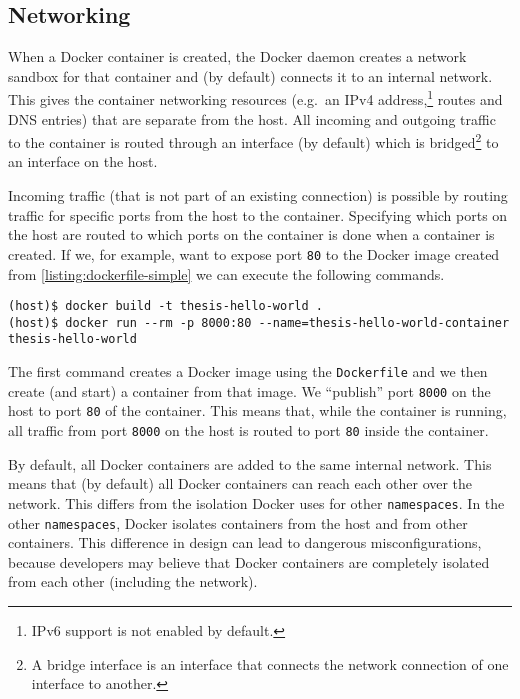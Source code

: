 \subsection{Networking}
When a Docker container is created, the Docker daemon creates a network sandbox for that container and (by default) connects it to an internal network. This gives the container networking resources (e.g.\ an IPv4 address,\footnote{IPv6 support is not enabled by default.} routes and DNS entries) that are separate from the host. All incoming and outgoing traffic to the container is routed through an interface (by default) which is bridged\footnote{A bridge interface is an interface that connects the network connection of one interface to another.} to an interface on the host.

\medskip

Incoming traffic (that is not part of an existing connection) is possible by routing traffic for specific ports from the host to the container.
Specifying which ports on the host are routed to which ports on the container is done when a container is created. If we, for example, want to expose port \lstinline{80} to the Docker image created from \autoref{listing:dockerfile-simple} we can execute the following commands.

\begin{lstlisting}[caption={Creating a Docker container with exposed port.},label={listing:docker-port},captionpos=b]
(host)$ docker build -t thesis-hello-world .
(host)$ docker run --rm -p 8000:80 --name=thesis-hello-world-container thesis-hello-world
\end{lstlisting}

The first command creates a Docker image using the \lstinline{Dockerfile} and we then create (and start) a container from that image. We ``publish'' port \lstinline{8000} on the host to port \lstinline{80} of the container. This means that, while the container is running, all traffic from port \lstinline{8000} on the host is routed to port \lstinline{80} inside the container.

\medskip

By default, all Docker containers are added to the same internal network. This means that (by default) all Docker containers can reach each other over the network. This differs from the isolation Docker uses for other \lstinline{namespaces}. In the other \lstinline{namespaces}, Docker isolates containers from the host and from other containers. This difference in design can lead to dangerous misconfigurations, because developers may believe that Docker containers are completely isolated from each other (including the network).
